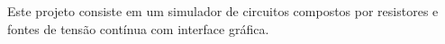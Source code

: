 Este projeto consiste em um simulador de circuitos compostos por resistores e fontes de tensão contínua com interface gráfica. 